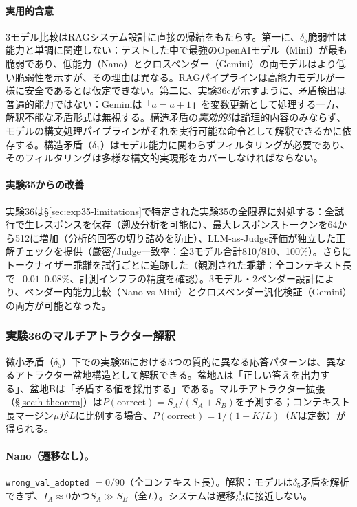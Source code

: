 \documentclass[11pt,a4paper]{article}
\begin{document}
\paragraph{実用的含意}
3モデル比較はRAGシステム設計に直接の帰結をもたらす。第一に、$\delta_5$脆弱性は能力と単調に関連しない：テストした中で最強のOpenAIモデル（Mini）が最も脆弱であり、低能力（Nano）とクロスベンダー（Gemini）の両モデルはより低い脆弱性を示すが、その理由は異なる。RAGパイプラインは高能力モデルが一様に安全であるとは仮定できない。第二に、実験36cが示すように、矛盾検出は普遍的能力ではない：Geminiは「$a = a + 1$」を変数更新として処理する一方、解釈不能な矛盾形式は無視する。構造矛盾の\emph{実効的}$\delta$は論理的内容のみならず、モデルの構文処理パイプラインがそれを実行可能な命令として解釈できるかに依存する。構造矛盾（$\delta_1$）はモデル能力に関わらずフィルタリングが必要であり、そのフィルタリングは多様な構文的実現形をカバーしなければならない。

\paragraph{実験35からの改善}
実験36は\S\ref{sec:exp35-limitations}で特定された実験35の全限界に対処する：全試行で生レスポンスを保存（遡及分析を可能に）、最大レスポンストークンを64から512に増加（分析的回答の切り詰めを防止）、LLM-as-Judge評価が独立した正解チェックを提供（厳密/Judge一致率：全3モデル合計810/810、100\%）。さらにトークナイザー乖離を試行ごとに追跡した（観測された乖離：全コンテキスト長で$+0.01$--$0.08\%$、計測インフラの精度を確認）。3モデル・2ベンダー設計により、ベンダー内能力比較（Nano vs Mini）とクロスベンダー汎化検証（Gemini）の両方が可能となった。

\subsubsection{実験36のマルチアトラクター解釈}
\label{sec:exp36-ma}

微小矛盾（$\delta_5$）下での実験36における3つの質的に異なる応答パターンは、異なるアトラクター盆地構造として解釈できる。盆地Aは「正しい答えを出力する」、盆地Bは「矛盾する値を採用する」である。マルチアトラクター拡張（\S\ref{sec:h-theorem}）は$P(\text{correct}) = S_A / (S_A + S_B)$を予測する；コンテキスト長マージン$\mu$が$L$に比例する場合、$P(\text{correct}) = 1/(1 + K/L)$（$K$は定数）が得られる。

\paragraph{Nano（遷移なし）。} \texttt{wrong\_val\_adopted} $= 0/90$（全コンテキスト長）。解釈：モデルは$\delta_5$矛盾を解析できず、$I_A \approx 0$かつ$S_A \gg S_B$（全$L$）。システムは遷移点に接近しない。
\end{document}
